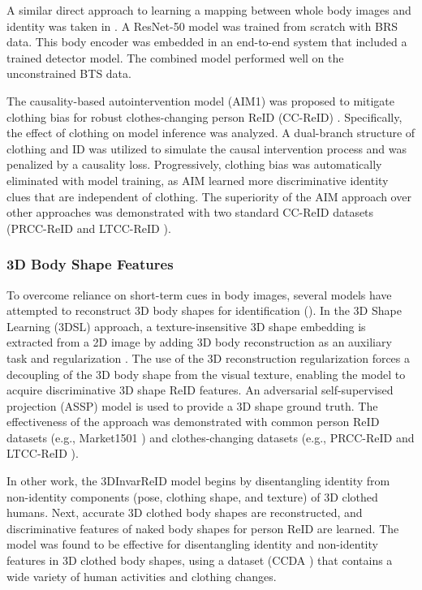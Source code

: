 A similar direct approach to learning a mapping between 
whole body images and identity was taken in \cite{huang2024whole}.  A ResNet-50 model was trained from scratch
with BRS data. This body encoder was embedded
in an end-to-end system that included a trained detector
model. The combined model performed well on the unconstrained BTS data.

The causality-based autointervention model (AIM1) was
proposed to mitigate clothing bias for robust clothes-changing person ReID
(CC-ReID) \cite{yang2023good}. Specifically, 
 the effect of clothing
on model inference was analyzed. A dual-branch structure of clothing and ID was
utilized to simulate the causal intervention process and 
was penalized by a causality loss. Progressively, clothing bias
was  automatically eliminated with model training, as AIM
 learned more discriminative identity clues that are
independent of clothing. The  superiority of the
 AIM approach over other approaches was demonstrated
 with two standard CC-ReID datasets (PRCC-ReID \cite{yang2019person} and  LTCC-ReID \cite{qian2020long}). 
 


\subsubsection{3D Body Shape Features}
To overcome reliance on short-term cues in body images,
several models have attempted to reconstruct 3D body shapes for
identification (\cite{chen2021learning, liu2023learning}).
In the 3D Shape Learning (3DSL) approach, a texture-insensitive 3D shape embedding is extracted
from a 2D image by adding 3D body reconstruction as an
auxiliary task and regularization \cite{chen2021learning}. 
The use of the 3D reconstruction regularization
forces a  decoupling of the 3D body shape from the visual texture, 
enabling the model to acquire discriminative 3D
shape ReID features.  An adversarial self-supervised 
projection (ASSP) model is used to provide a 3D shape ground truth. The effectiveness of the approach was
demonstrated with common person ReID
datasets (e.g., Market1501 \cite{zheng2015scalable}) and clothes-changing datasets (e.g., PRCC-ReID \cite{yang2019person} and  LTCC-ReID \cite{qian2020long}).

In other work, the 3DInvarReID model \cite{liu2023learning} begins by
disentangling identity from
non-identity components (pose, clothing shape, and texture)
of 3D clothed humans. Next, 
 accurate 3D
clothed body shapes are reconstructed,
and discriminative  features
of naked body shapes for person ReID are learned. The model was found to be effective for disentangling identity and non-identity features in 3D clothed
body shapes,  using a dataset (CCDA \cite{liu2023learning}) that contains a wide variety of human activities and clothing changes.


